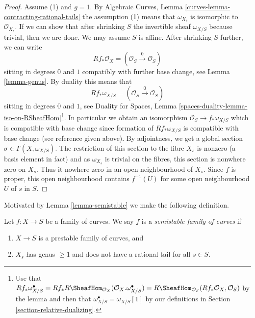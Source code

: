 \begin{proof}
\medskip\noindent
Assume (1) and $g = 1$. By
Algebraic Curves, Lemma \ref{curves-lemma-contracting-rational-tails}
the assumption (1) means that $\omega_{X_s}$ is isomorphic to
$\mathcal{O}_{X_s}$. If we can show that after shrinking $S$
the invertible sheaf $\omega_{X/S}$ because trivial, then
we are done. We may assume $S$ is affine. After shrinking $S$
further, we can write
$$
Rf_*\mathcal{O}_X = (\mathcal{O}_S \xrightarrow{0} \mathcal{O}_S)
$$
sitting in degrees $0$ and $1$
compatibly with further base change, see Lemma \ref{lemma-genus}.
By duality this means that
$$
Rf_*\omega_{X/S} = (\mathcal{O}_S \xrightarrow{0} \mathcal{O}_S)
$$
sitting in degrees $0$ and $1$, see
Duality for Spaces, Lemma
\ref{spaces-duality-lemma-iso-on-RSheafHom}\footnote{Use that
$Rf_*\omega_{X/S}^\bullet =
Rf_*R\SheafHom_{\mathcal{O}_X}(\mathcal{O}_X. \omega_{X/S}^\bullet) =
R\SheafHom_{\mathcal{O}_S}(Rf_*\mathcal{O}_X, \mathcal{O}_S)$
by the lemma and then that $\omega_{X/S}^\bullet = \omega_{X/S}[1]$ by
our definitions in Section \ref{section-relative-dualizing}.}.
In particular we obtain an isomorphism $\mathcal{O}_S \to f_*\omega_{X/S}$
which is compatible with base change since
formation of $Rf_*\omega_{X/S}$ is compatible with base change
(see reference given above).
By adjointness, we get a global section $\sigma \in \Gamma(X, \omega_{X/S})$.
The restriction of this section to the fibre $X_s$
is nonzero (a basis element in fact) and as
$\omega_{X_s}$ is trivial on the fibres,
this section is nonwhere zero on $X_s$.
Thus it nowhere zero in
an open neighbourhood of $X_s$. Since $f$ is proper, this open
neighbourhood contains $f^{-1}(U)$ for some open neighbourhood
$U$ of $s$ in $S$.
\end{proof}

\noindent
Motivated by Lemma \ref{lemma-semistable} we make the following definition.

\begin{definition}
\label{definition-semistable}
Let $f : X \to S$ be a family of curves.
We say $f$ is a {\it semistable family of curves} if
\begin{enumerate}
\item $X \to S$ is a prestable family of curves, and
\item $X_s$ has genus $\geq 1$ and
does not have a rational tail for all $s \in S$.
\end{enumerate}
\end{definition}

